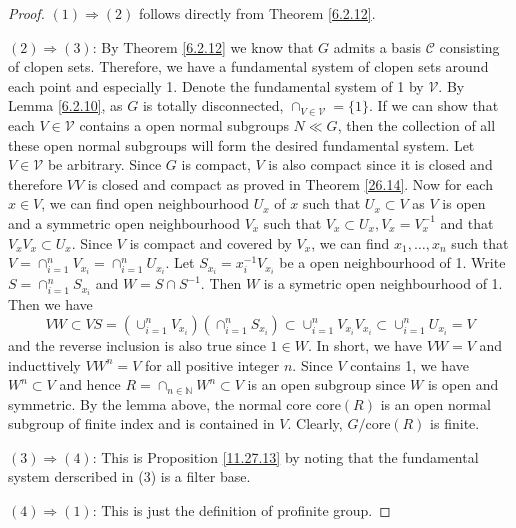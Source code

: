 \documentclass[12pt]{report}
\theoremstyle{definition}
\newcommand{\NN}{\mathbb{N}}
\begin{document}
\begin{proof}
	$(1)\Longrightarrow (2)$ follows directly from Theorem \ref{6.2.12}.


	$(2)\Longrightarrow (3)$: By Theorem \ref{6.2.12} we know that $G$ admits a basis $\mathcal{C}$ consisting of clopen sets. Therefore, we have a fundamental system of clopen sets around each point and especially 1. Denote the fundamental system of 1 by $\mathcal{V}$. By Lemma \ref{6.2.10}, as $G$ is totally disconnected, $\cap_{V\in\mathcal{V}}=\{1\}$. If we can show that each $V\in\mathcal{V}$ contains a open normal subgroups $N\ll G$, then the collection of all these open normal subgroups will form the desired fundamental system. Let $V\in\mathcal{V}$ be arbitrary. Since $G$ is compact, $V$ is also compact since it is closed and therefore $VV$ is closed and compact as proved in Theorem \ref{26.14}. Now for each $x\in V$, we can find open neighbourhood $U_x$ of $x$ such that $U_x\subset V$ as $V$ is open and a symmetric open neighbourhood $V_x$ such that $V_x\subset U_x, V_x=V_x^{-1}$ and that $V_xV_x\subset U_x$. Since $V$ is compact and covered by $V_x$, we can find $x_1,\dots,x_n$ such that $V=\cap_{i=1}^n V_{x_i}= \cap_{i=1}^n U_{x_i}$. Let $S_{x_i}=x_i^{-1}V_{x_i}$ be a open neighbourhood of 1. Write $S=\cap_{i=1}^n S_{x_i}$ and $W=S\cap S^{-1}$. Then $W$ is a symetric open neighbourhood of 1. Then we have $$VW\subset VS =(\cup_{i=1}^n V_{x_i})(\cap_{i=1}^n S_{x_i})\subset \cup_{i=1}^n V_{x_i}V_{x_i} \subset \cup_{i=1}^n U_{x_i} = V $$ and the reverse inclusion is also true since $1\in W$. In short, we have $VW=V$ and inducttively $VW^n = V$ for all positive integer $n$. Since $V$ contains 1, we have $W^n\subset V$ and hence $R=\cap_{n\in \NN}W^n \subset V$ is an open subgroup since $W$ is open and symmetric. By the lemma above, the normal core $\mbox{core}(R)$ is an open normal subgroup of finite index and is contained in $V$. Clearly, $G/\mbox{core}(R)$ is finite.


	$(3)\Longrightarrow (4)$: This is Proposition \ref{11.27.13} by noting that the fundamental system derscribed in (3) is a filter base. 


	$(4)\Longrightarrow (1)$: This is just the definition of profinite group.
\end{proof}
\end{document}
